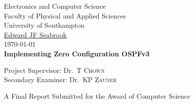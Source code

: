 
\begin{titlepage}

\begin{center}



\LARGE Electronics and Computer Science\\
Faculty of Physical and Applied Sciences\\
University of Southampton
\\[1.5cm]

\href{mailto:ejfs1g10@ecs.soton.ac.uk}{Edward JF Seabrook}\\[0.5cm]

\today \\[1cm]
{\bfseries Implementing Zero Configuration OSPFv3}\\[1.5cm]

\vfill

\large
Project Supervisor: 
Dr.~T \textsc{Chown}\\

\large
Secondary Examiner:
Dr.~KP \textsc{Zauner} 

\vfill

A Final Report Submitted for the Award of Computer Science

\end{center}

\end{titlepage}
